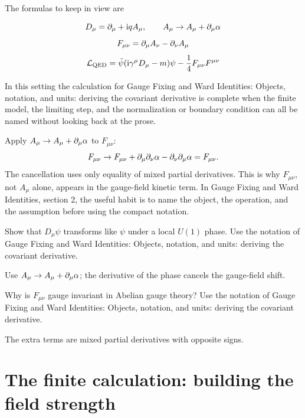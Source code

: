 The formulas to keep in view are

\[
  D_\mu=\partial_\mu+\mathrm i qA_\mu,\qquad A_\mu\to A_\mu+\partial_\mu\alpha
\]
\[
  F_{\mu\nu}=\partial_\mu A_\nu-\partial_\nu A_\mu
\]
\[
  \mathcal L_{\mathrm{QED}}=\bar\psi(\mathrm i\gamma^\mu D_\mu-m)\psi-\frac14F_{\mu\nu}F^{\mu\nu}
\]

In this setting the calculation for Gauge Fixing and Ward Identities: Objects, notation, and units: deriving the covariant derivative is complete when the finite model, the limiting step, and the normalization or boundary condition can all be named without looking back at the prose.




\begin{example}
Apply \(A_\mu\to A_\mu+\partial_\mu\alpha\) to \(F_{\mu\nu}\):
\[
  F_{\mu\nu}\to F_{\mu\nu}+\partial_\mu\partial_\nu\alpha-\partial_\nu\partial_\mu\alpha=F_{\mu\nu}.
\]
The cancellation uses only equality of mixed partial derivatives.  This is why \(F_{\mu\nu}\), not \(A_\mu\) alone, appears in the gauge-field kinetic term.  In Gauge Fixing and Ward Identities, section 2, the useful habit is to name the object, the operation, and the assumption before using the compact notation.
\end{example}



\begin{exercise}
Show that \(D_\mu\psi\) transforms like \(\psi\) under a local \(U(1)\) phase.  Use the notation of Gauge Fixing and Ward Identities: Objects, notation, and units: deriving the covariant derivative.
\begin{answer}
Use \(A_\mu\to A_\mu+\partial_\mu\alpha\); the derivative of the phase cancels the gauge-field shift.
\end{answer}
\end{exercise}

\begin{exercise}
Why is \(F_{\mu\nu}\) gauge invariant in Abelian gauge theory?  Use the notation of Gauge Fixing and Ward Identities: Objects, notation, and units: deriving the covariant derivative.
\begin{answer}
The extra terms are mixed partial derivatives with opposite signs.
\end{answer}
\end{exercise}



\section{The finite calculation: building the field strength}

